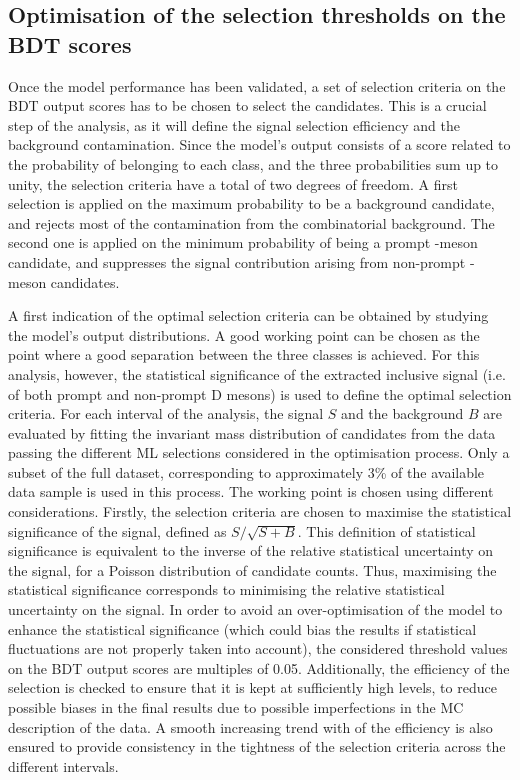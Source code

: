 \subsection{Optimisation of the selection thresholds on the BDT scores}
Once the model performance has been validated, a set of selection criteria on the BDT output scores has to be chosen to select the candidates. This is a crucial step of the analysis, as it will define the signal selection efficiency and the background contamination. Since the model's output consists of a score related to the probability of belonging to each class, and the three probabilities sum up to unity, the selection criteria have a total of two degrees of freedom. A first selection is applied on the maximum probability to be a background candidate, and rejects most of the contamination from the combinatorial background. The second one is applied on the minimum probability of being a prompt \ds-meson candidate, and suppresses the signal contribution arising from non-prompt \ds-meson candidates. 

A first indication of the optimal selection criteria can be obtained by studying the model's output distributions. A good working point can be chosen as the point where a good separation between the three classes is achieved. For this analysis, however, the statistical significance of the extracted inclusive signal (i.e. of both prompt and non-prompt D mesons) is used to define the optimal selection criteria. For each \pt interval of the analysis, the signal $S$ and the background $B$ are evaluated by fitting the invariant mass distribution of candidates from the data passing the different ML selections considered in the optimisation process. Only a subset of the full dataset, corresponding to approximately 3\% of the available data sample is used in this process. The working point is chosen using different considerations. Firstly, the selection criteria are chosen to maximise the statistical significance of the signal, defined as $S/\sqrt{S+B}$. This definition of statistical significance is equivalent to the inverse of the relative statistical uncertainty on the signal, for a Poisson distribution of candidate counts. Thus, maximising the statistical significance corresponds to minimising the relative statistical uncertainty on the signal. In order to avoid an over-optimisation of the model to enhance the statistical significance (which could bias the results if statistical fluctuations are not properly taken into account), the considered threshold values on the BDT output scores are multiples of 0.05. Additionally, the efficiency of the selection is checked to ensure that it is kept at sufficiently high levels, to reduce possible biases in the final results due to possible imperfections in the MC description of the data. A smooth increasing trend with \pt of the efficiency is also ensured to provide consistency in the tightness of the selection criteria across the different \pt intervals. 

